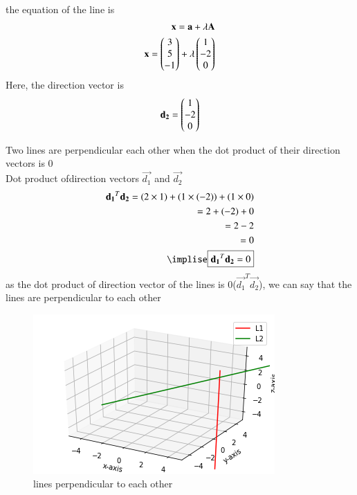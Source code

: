 \documentclass[journal,12pt,twocolumn]{IEEEtran}
\begin{document}
\\
the equation of the line is 
\begin{align}
\mathbf{x}=\mathbf{a}+\lambda\mathbf{A}
\\
\mathbf{x}=\begin{pmatrix}3\\5\\-1\end{pmatrix}+\lambda\begin{pmatrix}1\\-2\\0\end{pmatrix}
\end{align}
Here, the direction vector is 
\begin{align}
\mathbf{d_2}=\begin{pmatrix}1\\-2\\0\end{pmatrix}
\end{align}

Two lines are perpendicular each other when the dot product of their direction vectors is 0
\\
Dot product ofdirection vectors  $\vec{d_1}$ and $\vec{d_2}$
\begin{align}
\vec{d_1}^T\vec{d_2}=(2 \times 1) +(1 \times (-2)) +(1 \times 0) 
\\
=2+(-2) +0
\\
=2-2
\\
=0
\\
\implise \boxed{\vec{d_1}^T\vec{d_2}=0}
\end{align}
as the dot product of direction vector of the lines is 0($\vec{d_1}^T\vec{d_2}$), we can say that the lines are perpendicular to each other
\begin{figure}[ht]
\centering
\includegraphics[width=\columnwidth]{download.png}
\caption{lines perpendicular to each other}
\label{Plot of the line}
\end{figure}
\end{document}
